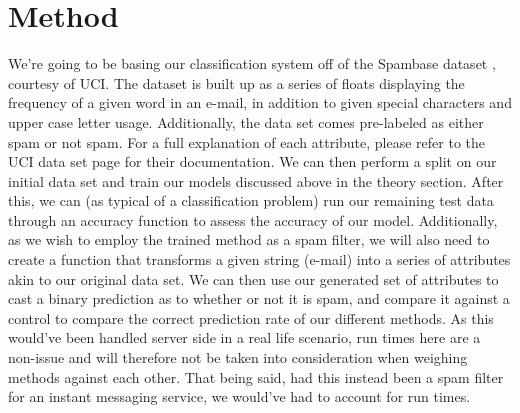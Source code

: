 \documentclass{article}
\begin{document}
\section{Method}
We're going to be basing our classification system off of the Spambase dataset \cite{data}, courtesy of UCI. The dataset is built up as a series of floats displaying the frequency of a given word in an e-mail, in addition to given special characters and upper case letter usage. Additionally, the data set comes pre-labeled as either spam or not spam. For a full explanation of each attribute, please refer to the UCI data set page for their documentation.\newline
We can then perform a split on our initial data set and train our models discussed above in the theory section. After this, we can (as typical of a classification problem) run our remaining test data through an accuracy function to assess the accuracy of our model. \newline
Additionally, as we wish to employ the trained method as a spam filter, we will also need to create a function that transforms a given string (e-mail) into a series of attributes akin to our original data set. We can then use our generated set of attributes to cast a binary prediction as to whether or not it is spam, and compare it against a control to compare the correct prediction rate of our different methods. \newline
As this would've been handled server side in a real life scenario, run times here are a non-issue and will therefore not be taken into consideration when weighing methods against each other. That being said, had this instead been a spam filter for an instant messaging service, we would've had to account for run times.
\end{document}
